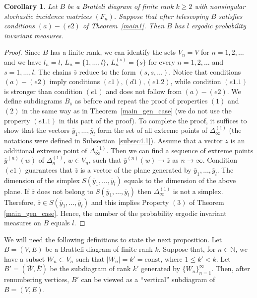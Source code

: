 \documentclass[11pt, english, reqno]{amsart}
\theoremstyle{definition}
\theoremstyle{remark}
\theoremstyle{plain}
\newtheorem{corol}[defin]{Corollary}
\def\ov{\overline}
\numberwithin{equation}{section}
\begin{document}
{\begin{corol}\label{inv_main_1}
Let $B$ be a Bratteli diagram of finite rank $k \geq 2$ with nonsingular 
stochastic incidence matrices $(F_n)$. Suppose that  after telescoping $B$ 
satisfies conditions $(a) - (e2)$ of Theorem~\ref{main1}. Then $B$ has $l$ 
ergodic probability  invariant measures.
\end{corol}

\begin{proof}
Since $B$ has a finite rank, we can identify the sets $V_n = V$ for $n = 1,2,
\ldots$ and we have $l_n = l$, $L_n = \{1, \ldots, l\}$, $L_n^{(s)} = \{s\}$ 
for every $n = 1,2,\ldots$ and $s = 1,
\ldots, l$. The chains $\ov s$ reduce to the form $(s,s,\ldots)$. Notice that
conditions $(a)-(e2)$ imply conditions $(c1), (d1), (e1.2)$, while condition
$(e1.1)$ is stronger than condition $(e1)$ and does not follow from $(a)-
(e2)$. We define subdiagrams $B_{\ov s}$ as before and repeat the proof of
properties $(1)$ and $(2)$ in the same way as in Theorem~\ref{main_gen_case} (we do not use the property $(e1.1)$ in this part of
the proof). To complete the proof, it suffices to show that the vectors $\ov
y_1,\ldots, \ov y_l$ form the set of all extreme points of $\Delta_{\infty}^{(1)}$
(the notations were defined in Subsection~\ref{subsec4.1}). Assume that a
vector $\ov z$ is an additional extreme point of $\Delta_{\infty}^{(1)}$. Then we
can find a sequence of extreme points $\ov y^{(n)}(w)$ of $\Delta_n^{(1)}$, $w
\in V_n$, such that $\ov y^{(n)}(w) \rightarrow \ov z$ as $n \rightarrow
\infty$. Condition $(e1)$ guarantees that $\ov z$ is a vector of the plane
generated by $\ov y_1, \ldots, \ov y_l$. The dimension of the simplex
$S(\ov y_1, \ldots, \ov y_l)$ equals to the dimension of the above plane. If
$\ov z$ does not belong to $S(\ov y_1, \ldots, \ov y_l)$ then
$\Delta_{\infty}^{(1)}$ is not a simplex. Therefore, $\ov z  \in S(\ov y_1,
\ldots, \ov y_l)$ and this implies Property $(3)$ of Theorem~
\ref{main_gen_case}. Hence, the number of the probability ergodic invariant measures on $B$ equals $l$.
\end{proof}

We will need the following definitions to state the next proposition.
Let $B = (V,E)$ be a Bratteli diagram of finite rank $k$. Suppose that, for
$n\in \mathbb N$, we have a subset $W_n \subset V_n$ such that
 $|W_n| = k' = \mathrm{const}$, where
$1 \leq k' < k$. Let $B' = (\ov W, \ov E)$ be the subdiagram of rank $k'$
generated by $\{W_n\}_{n = 1}^{\infty}$. Then, after renumbering
vertices, $B'$ can be viewed as a ``vertical'' subdiagram of $B = (V,E)$.

}
\end{document}
